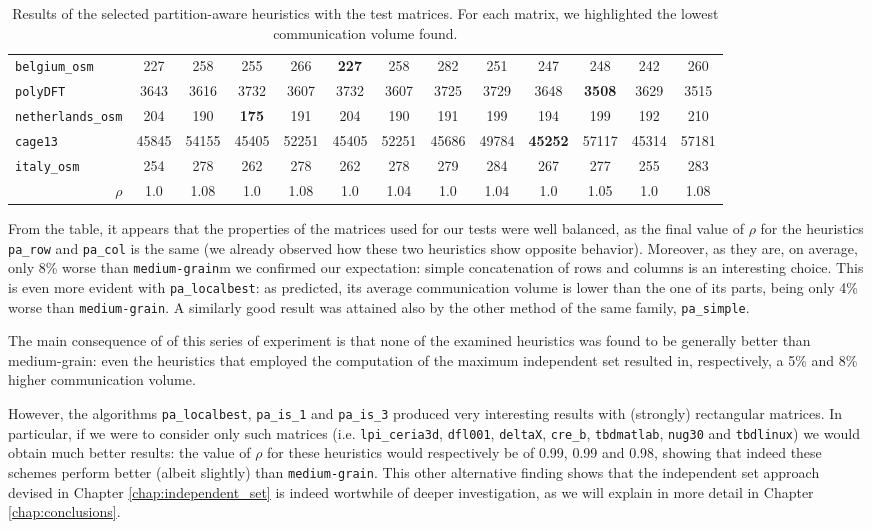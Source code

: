 \begin{table}
\begin{tabular}{|l|c|c||c|c||c|c||c|c||c|c||c|c|}
	\verb|belgium_osm| & 227 & 258 & 255 & 266 & \textbf{227} & 258 &  282 & 251 & 247 & 248 & 242 & 260 \\
	\verb|polyDFT| & 3643 & 3616 & 3732 & 3607 & 3732 &  3607 & 3725 & 3729 & 3648 & \textbf{3508} & 3629 & 3515 \\
	\verb|netherlands_osm| & 204 & 190 & \textbf{175} & 191 & 204 & 190 & 191 & 199 & 194 & 199 & 192 & 210 \\
	\verb|cage13| & 45845 & 54155 & 45405 & 52251 & 45405 & 52251 & 45686 & 49784 & \textbf{45252} & 57117 & 45314 & 57181\\
	\verb|italy_osm| & 254 & 278 & 262 & 278 &262 & 278 & 279 & 284 & 267 & 277 & 255 & 283  \\ \hline
	\multicolumn{1}{|r|}{$\rho$}	& 1.0  & 1.08 & 1.0  & 1.08 & 1.0  & 1.04 & 1.0  & 1.04 & 1.0  & 1.05 & 1.0  & 1.08 \\ \hline
		\end{tabular}
	\caption{Results of the selected partition-aware heuristics with the test matrices. For each matrix, we highlighted the lowest communication volume found.} \label{tab:final_pa}
\end{table}

From the table, it appears that the properties of the matrices used for our tests were well balanced, as the final value of $\rho$ for the heuristics \verb|pa_row| and \verb|pa_col| is the same (we already observed how these two heuristics show opposite behavior). Moreover, as they are, on average, only 8\% worse than \verb|medium-grain|m we confirmed our expectation: simple concatenation of rows and columns is an interesting choice. This is even more evident with \verb|pa_localbest|: as predicted, its average communication volume is lower than the one of its parts, being only 4\% worse than \verb|medium-grain|. A similarly good result was attained also by the other method of the same family, \verb|pa_simple|.

The main consequence of of this series of experiment is that none of the examined heuristics was found to be generally better than medium-grain: even the heuristics that employed the computation of the maximum independent set resulted in, respectively, a 5\% and 8\% higher communication volume. 

However, the algorithms \verb|pa_localbest|, \verb|pa_is_1| and \verb|pa_is_3| produced very interesting results with (strongly) rectangular matrices. In particular, if we were to consider only such matrices (i.e. \verb|lpi_ceria3d|, \verb|dfl001|, \verb|deltaX|, \verb|cre_b|, \verb|tbdmatlab|, \verb|nug30| and \verb|tbdlinux|) we would obtain much better results: the value of $\rho$ for these heuristics would respectively be of 0.99, 0.99 and 0.98, showing that indeed these schemes perform better (albeit slightly) than \verb|medium-grain|. This other alternative finding shows that the independent set approach devised in Chapter \ref{chap:independent_set} is indeed wortwhile of deeper investigation, as we will explain in more detail in Chapter \ref{chap:conclusions}.
